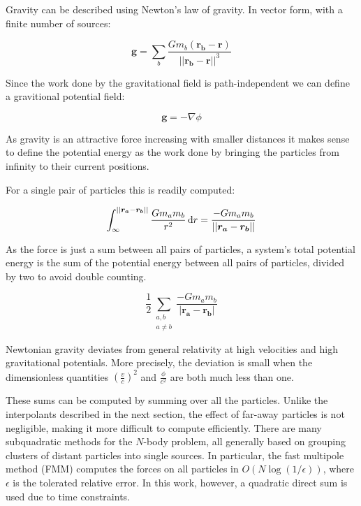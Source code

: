 \documentclass[../main.tex]{subfiles}
\begin{document}
Gravity can be described using Newton's law of gravity. In vector form, with a finite number of
sources:

\begin{equation}
    \bm{g} = \sum_b \frac{G m_b (\bm{r_b} - \bm{r})}{||\bm{r_b} - \bm{r}||^3}
\end{equation}

Since the work done by the gravitational field is path-independent we can define a gravitional
potential field:

\begin{equation}
    \bm{g} = - \nabla \phi
\end{equation}

As gravity is an attractive force increasing with smaller distances it makes
sense to define the potential energy as the work done by bringing the particles from infinity to
their current positions.

For a single pair of particles this is readily computed:

\begin{equation}
    \int_{\infty}^{||\bm{r_a} - \bm{r_b}||} \frac{G m_a m_b}{r^2} \,\mathrm{d} r = \frac{-G m_a m_b}{||\bm{r_a} -
    \bm{r_b}||}
\end{equation}

As the force is just a sum between all pairs of particles, a system's total potential energy is the sum of the
potential energy between all pairs of particles, divided by two to avoid double counting.

\begin{equation}
    \frac{1}{2} \sum_{\substack{a, b \\ a \ne b}} \frac{-G m_a m_b}{|\bm{r_a} - \bm{r_b}|}
\end{equation}

Newtonian gravity deviates from general relativity at high velocities and high gravitational
potentials. More precisely, the deviation is small when the dimensionless quantities $(\frac{v}{c})^2$
and $\frac{\phi}{c^2}$ are both much less than one. \autocite{wikipedia_newtons_law}

These sums can be computed by summing over all the particles. Unlike the interpolants described in
the next section, the effect of far-away particles is not negligible, making it more difficult to
compute efficiently. There are many subquadratic methods for the $N$-body problem, all generally
based on grouping clusters of distant particles into single sources. In particular, the fast
multipole method (FMM) computes the forces on all particles in $O(N \log (1 / \epsilon) )$, where
$\epsilon$ is the tolerated relative error. \autocite{shortcourse_fmm} In this work, however, a
quadratic direct sum is used due to time constraints.
\end{document}

